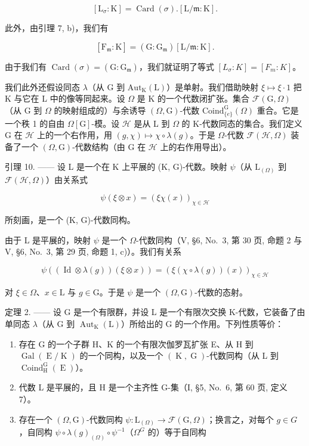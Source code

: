 \[
[ \mathrm{L} _ {\sigma}: \mathrm{K} ] = \operatorname{Card} (\sigma). [ \mathrm{L} / \mathfrak {m}: \mathrm{K} ].
\]

此外，由引理 7, b)，我们有

\[
[ \mathrm{F} _ {\mathfrak {m}}: \mathrm{K} ] = (\mathrm{G}: \mathrm{G} _ {\mathfrak {m}}) [ \mathrm{L} / \mathfrak {m}: \mathrm{K} ].
\]

由于我们有 \(\operatorname{Card}(\sigma)=(\mathrm{G}:\mathrm{G}_{\mathfrak{m}})\)，我们就证明了等式 \([L_{\sigma}:K]=[F_{m}:K]\)。

我们此外还假设同态 \(\lambda\)（从 G 到 \(\mathrm{Aut}_{\mathrm{K}}(\mathrm{L})\)）是单射。我们借助映射 \(\xi \mapsto \xi \cdot 1\) 把 K 与它在 L 中的像等同起来。设 \(\Omega\) 是 K 的一个代数闭扩张。集合 \(\mathcal{F}(\mathrm{G},\Omega)\)（从 G 到 \(\Omega\) 的映射组成的）与余诱导 \((\Omega ,\mathrm{G})\)-代数 \(\mathrm{Coind}_{\{e\}}^{\mathrm{G}}(\Omega)\) 重合。它是一个秩 1 的自由 \(\Omega [\mathrm{G}]\)-模。设 \(\mathcal{H}\) 是从 L 到 \(\Omega\) 的 K-代数同态的集合。我们定义 G 在 \(\mathcal{H}\) 上的一个右作用，用 \((g,\chi)\mapsto \chi \circ \lambda (g)\)。于是 \(\Omega\)-代数 \(\mathcal{F}(\mathcal{H},\Omega)\) 装备了一个 \((\Omega ,\mathrm{G})\)-代数结构（由 G 在 \(\mathcal{H}\) 上的右作用导出）。

引理 10. —— 设 L 是一个在 K 上平展的 (K, G)-代数。映射 \(\psi\)（从 \(\mathrm{L}_{(\Omega)}\) 到 \(\mathcal{F}(\mathcal{H},\Omega)\)）由关系式

\[
\psi (\xi \otimes x) = (\xi \chi (x)) _ {\chi \in \mathscr {H}}
\]

所刻画，是一个 (K, G)-代数同构。

由于 L 是平展的，映射 \(\psi\) 是一个 \(\Omega\)-代数同构（V, §6, No.~3, 第 30 页, 命题 2 与 V, §6, No.~3, 第 29 页, 命题 1, c)）。我们有关系

\[
\psi ((\operatorname{Id} \otimes \lambda (g)) (\xi \otimes x)) = (\xi (\chi \circ \lambda (g)) (x)) _ {\chi \in \mathscr {H}}
\]

对 \(\xi \in \Omega\)、\(x \in \mathrm{L}\) 与 \(g \in \mathrm{G}\)。于是 \(\psi\) 是一个 \((\Omega, \mathrm{G})\)-代数的态射。

定理 2. —— 设 G 是一个有限群，并设 L 是一个有限次交换 K-代数，它装备了由单同态 \(\lambda\)（从 G 到 \(\operatorname{Aut}_{\mathrm{K}}(\mathrm{L})\)）所给出的 G 的一个作用。下列性质等价：

\begin{enumerate}
\def\labelenumi{(\roman{enumi})}
\item
  存在 G 的一个子群 H、K 的一个有限次伽罗瓦扩张 E、从 H 到 \(\operatorname{Gal}(\operatorname{E}/\operatorname{K})\) 的一个同构，以及一个 \((\operatorname{K},\operatorname{G})\)-代数同构（从 L 到 \(\operatorname{Coind}_{\operatorname{H}}^{\operatorname{G}}(\operatorname{E})\)）。
\item
  代数 L 是平展的，且 H 是一个主齐性 G-集（I, §5, No.~6, 第 60 页, 定义 7）。
\item
  存在一个 \((\Omega,\mathrm{G})\)-代数同构 \(\psi:\mathrm{L}_{(\Omega)}\to\mathcal{F}(\mathrm{G},\Omega)\)；换言之，对每个 \(g\in G\)，自同构 \(\psi\circ\lambda(g)_{(\Omega)}\circ\psi^{-1}\)（\(\Omega^{G}\) 的）等于自同构
\end{enumerate}

